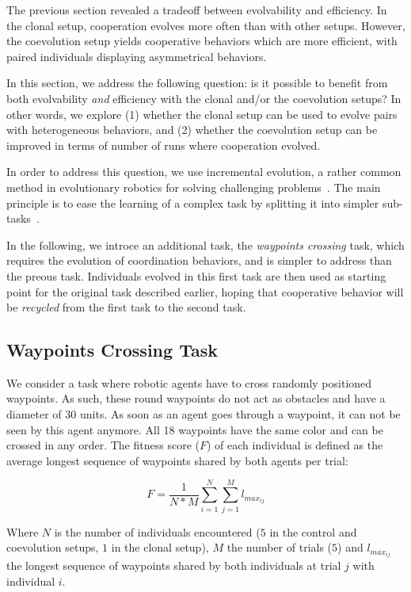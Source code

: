   The previous section revealed a tradeoff between evolvability and efficiency. In the clonal setup, cooperation evolves more often than with other setups. However, the coevolution setup yields cooperative behaviors which are more efficient, with paired individuals displaying asymmetrical behaviors.

  In this section, we address the following question: is it possible to benefit from both evolvability \textit{and} efficiency with the clonal and/or the coevolution setups? In other words, we explore (1) whether the clonal setup can be used to evolve pairs with heterogeneous behaviors, and (2) whether the coevolution setup can be improved in terms of number of runs where cooperation evolved.

  In order to address this question, we use incremental evolution, a rather common method in evolutionary robotics for solving challenging problems~\parencite{Dorigo1994,Saksida1997,Bongard2008,Doncieux2013}. The main principle is to ease the learning of a complex task by splitting it into simpler sub-tasks~\parencite{Perkins1996}.

  In the following, we introce an additional task, the \textit{waypoints crossing} task, which requires the evolution of coordination behaviors, and is simpler to address than the preous task. Individuals evolved in this first task are then used as starting point for the original task described earlier, hoping that cooperative behavior will be \emph{recycled} from the first task to the second task.
  
  \subsection{Waypoints Crossing Task}  

    We consider a task where robotic agents have to cross randomly positioned waypoints. As such, these round waypoints do not act as obstacles and have a diameter of 30 units. As soon as an agent goes through a waypoint, it can not be seen by this agent anymore. All 18 waypoints have the same color and can be crossed in any order. The fitness score (\(F\)) of each individual is defined as the average longest sequence of waypoints shared by both agents per trial:

    \[
    F = \frac{1}{N*M} \sum_{i=1}^{N} \sum_{j=1}^{M} l_{max_{ij}}
    \]

    Where \(N\) is the number of individuals encountered ($5$ in the control and coevolution setups, $1$ in the clonal setup), \(M\) the number of trials ($5$) and \(l_{max_{ij}}\) the longest sequence of waypoints shared by both individuals at trial \(j\) with individual \(i\).

